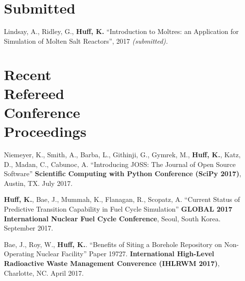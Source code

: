 \documentclass[margin,line]{resume}
\newcommand{\Cyclus}{\textsc{Cyclus}\xspace}%
\begin{document}
\begin{resume}
    \section{\mysidestyle Submitted}
      \begin{bibenum}
       \item Lindsay, A., Ridley, G., \textbf{Huff, K.} ``Introduction to 
               Moltres: an Application for Simulation of Molten Salt 
               Reactors'',  2017 \textsl{(submitted).} 
      \end{bibenum}
    \section{\mysidestyle Recent\\Refereed\\Conference\\Proceedings}
    \begin{bibenum}
    \item Niemeyer, K., Smith, A., Barba, L., Githinji, G., Gymrek, M., 
            \textbf{Huff, K.}, Katz, D., Madan, C., Cabunoc, A. ``Introducing 
            JOSS: The Journal of Open Source Software'' \textbf{Scientific 
            Computing with Python Conference (SciPy 2017)}, Austin, TX. July 
            2017.
    \item \textbf{Huff, K.}, Bae, J., Mummah, K., Flanagan, R., Scopatz, A.
            ``Current Status of Predictive Transition Capability in Fuel Cycle 
            Simulation'' \textbf{GLOBAL 2017 International Nuclear Fuel Cycle 
            Conference}, Seoul, South Korea. September 2017.
      \item Bae, J., Roy, W., \textbf{Huff, K.}.
            ``Benefits of Siting a Borehole Repository on Non-Operating Nuclear 
            Facility'' Paper 19727.  \textbf{International High-Level Radioactive 
            Waste Management Converence (IHLRWM 2017)},
            Charlotte, NC. April 2017. 

\end{bibenum}
\end{resume}
\end{document}
